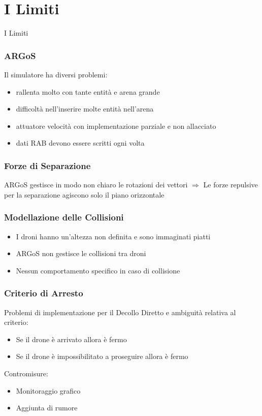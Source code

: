 \documentclass{beamer}
\begin{document}
\section{I Limiti}
\begin{frame}
\centering
\Huge
I Limiti
\end{frame}

\begin{frame}
\frametitle{ARGoS}
Il simulatore ha diversi problemi:

\begin{itemize}
  \item rallenta molto con tante entit\`a e arena grande
  \item difficolt\`a nell'inserire molte entit\`a nell'arena
  \item attuatore velocit\`a con implementazione parziale e non allacciato
  \item dati RAB devono essere scritti ogni volta
\end{itemize}
\end{frame}

\begin{frame}
\frametitle{Forze di Separazione}
ARGoS gestisce in modo non chiaro le rotazioni dei vettori $\Rightarrow$ Le forze repulsive per la separazione agiscono solo il piano orizzontale
\end{frame}

\begin{frame}
\frametitle{Modellazione delle Collisioni}
\begin{itemize}
  \item I droni hanno un'altezza non definita e sono immaginati piatti
  \item ARGoS non gestisce le collisioni tra droni
  \item Nessun comportamento specifico in caso di collisione
\end{itemize}
\end{frame}

\begin{frame}
\frametitle{Criterio di Arresto}
Problemi di implementazione per il Decollo Diretto e ambiguit\`a relativa al criterio:
\begin{itemize}
  \item Se il drone \`e arrivato allora \`e fermo
  \item Se il drone \`e impossibilitato a proseguire allora \`e fermo
\end{itemize}

Contromisure:
\begin{itemize}
  \item Monitoraggio grafico
  \item Aggiunta di rumore
\end{itemize}
\end{frame}
\end{document}
